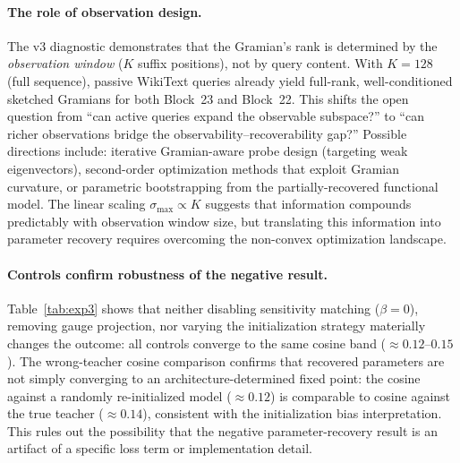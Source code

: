 \documentclass{article}
\begin{document}
\paragraph{The role of observation design.}
The v3 diagnostic demonstrates that the Gramian's rank is determined by the \emph{observation window} ($K$ suffix positions), not by query content.  With $K{=}128$ (full sequence), passive WikiText queries already yield full-rank, well-conditioned sketched Gramians for both Block~23 and Block~22.  This shifts the open question from ``can active queries expand the observable subspace?'' to ``can richer observations bridge the observability--recoverability gap?''  Possible directions include: iterative Gramian-aware probe design (targeting weak eigenvectors), second-order optimization methods that exploit Gramian curvature, or parametric bootstrapping from the partially-recovered functional model.  The linear scaling $\sigma_{\max} \propto K$ suggests that information compounds predictably with observation window size, but translating this information into parameter recovery requires overcoming the non-convex optimization landscape.

\paragraph{Controls confirm robustness of the negative result.}
Table~\ref{tab:exp3} shows that neither disabling sensitivity matching ($\beta = 0$), removing gauge projection, nor varying the initialization strategy materially changes the outcome: all controls converge to the same cosine band ($\approx 0.12$--$0.15$).  The wrong-teacher cosine comparison confirms that recovered parameters are not simply converging to an architecture-determined fixed point: the cosine against a randomly re-initialized model ($\approx 0.12$) is comparable to cosine against the true teacher ($\approx 0.14$), consistent with the initialization bias interpretation.  This rules out the possibility that the negative parameter-recovery result is an artifact of a specific loss term or implementation detail.
\end{document}
